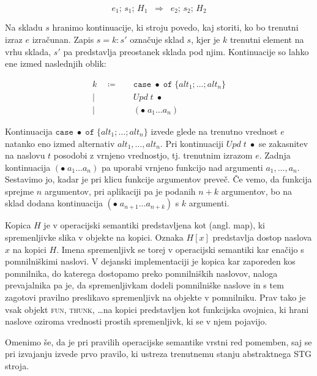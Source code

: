 \begin{equation}
	e_1; \, s_1; \, H_1  \;\; \Rightarrow  \;\; e_2; \, s_2; \, H_2
	\label{eq:operacijska-semantika-oblika-pravil}
\end{equation}

Na skladu $s$ hranimo kontinuacije, ki stroju povedo, kaj storiti, ko bo trenutni izraz $e$ izračunan. Zapis $s = k : s'$ označuje sklad $s$, kjer je $k$ trenutni element na vrhu sklada, $s'$ pa predstavlja preostanek sklada pod njim. Kontinuacije so lahko ene izmed naslednjih oblik:

\begin{align*}
	k \quad \coloneq& \quad \texttt{case} \; \bullet \; \texttt{of} \; \{ alt_1; \dots; alt_n \}\\
	\vert& \quad \textit{Upd} \; t \; \bullet\\
	\vert& \quad (\bullet \; a_1 \dots a_n)
\end{align*}

Kontinuacija $\texttt{case} \; \bullet \; \texttt{of} \; \{ alt_1; \dots; alt_n \}$ izvede glede na trenutno vrednost $e$ natanko eno izmed alternativ $alt_1, \dots, alt_n$. Pri kontinuaciji $\textit{Upd} \; t \; \bullet$ se zakasnitev na naslovu $t$ posodobi z vrnjeno vrednostjo, tj. trenutnim izrazom $e$. Zadnja kontinuacija $(\bullet \; a_1 \dots a_n)$ pa uporabi vrnjeno funkcijo nad argumenti $a_1, \dots, a_n$. Sestavimo jo, kadar je pri klicu funkcije argumentov preveč. Če vemo, da funkcija sprejme $n$ argumentov, pri aplikaciji pa je podanih $n + k$ argumentov, bo na sklad dodana kontinuacija $(\bullet \; a_{n + 1 } \dots a_{ n + k })$ s $k$ argumenti.

Kopica $H$ je v operacijski semantiki predstavljena kot  (angl. map), ki spremenljivke slika v objekte na kopici. Oznaka $H[x]$ predstavlja dostop naslova $x$ na kopici $H$. Imena spremenljivk se torej v operacijski semantiki kar enačijo s pomnilniškimi naslovi. V dejanski implementaciji je kopica kar zaporeden kos pomnilnika, do katerega dostopamo preko pomnilniških naslovov, naloga prevajalnika pa je, da spremenljivkam dodeli pomnilniške naslove in s tem zagotovi pravilno preslikavo spremenljivk na objekte v pomnilniku. Prav tako je vsak objekt \textsc{fun}, \textsc{thunk}, \dots na kopici predstavljen kot funkcijska ovojnica, ki hrani naslove oziroma vrednosti prostih spremenljivk, ki se v njem pojavijo.

Omenimo še, da je pri pravilih operacijske semantike vrstni red pomemben, saj se pri izvajanju izvede prvo pravilo, ki ustreza trenutnemu stanju abstraktnega STG stroja.

